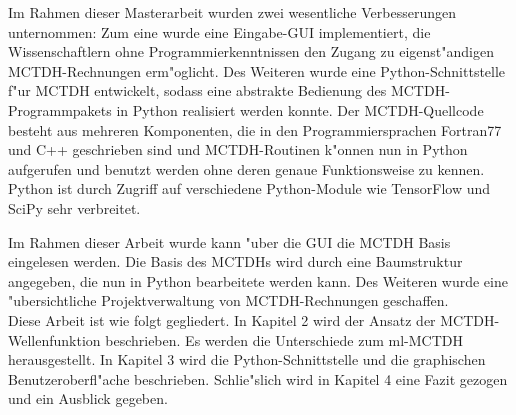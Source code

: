 Im Rahmen dieser Masterarbeit wurden zwei wesentliche Verbesserungen unternommen: Zum eine wurde eine Eingabe-GUI implementiert, die Wissenschaftlern
ohne Programmierkenntnissen den Zugang zu eigenst"andigen MCTDH-Rechnungen erm"oglicht.
Des Weiteren wurde eine Python-Schnittstelle f"ur MCTDH entwickelt, sodass eine abstrakte Bedienung des MCTDH-Programmpakets in Python
realisiert werden konnte. Der MCTDH-Quellcode besteht aus mehreren Komponenten, die in den Programmiersprachen Fortran77 und C++ geschrieben sind und
 MCTDH-Routinen k"onnen nun in Python aufgerufen und benutzt werden ohne deren genaue Funktionsweise zu kennen.
 Python ist durch Zugriff auf verschiedene Python-Module wie TensorFlow \cite{TensorFlow} und SciPy\cite{SciPy} sehr verbreitet.
 
 Im Rahmen dieser Arbeit wurde kann "uber die GUI
 die MCTDH Basis eingelesen werden. Die Basis des MCTDHs wird durch eine Baumstruktur angegeben, die nun in Python bearbeitete werden kann.
 Des Weiteren wurde eine "ubersichtliche Projektverwaltung  von MCTDH-Rechnungen geschaffen.  
\\Diese Arbeit ist wie folgt gegliedert. In Kapitel 2 wird der Ansatz der MCTDH-Wellenfunk\-tion beschrieben. Es werden die Unterschiede zum ml-MCTDH herausgestellt.
In Kapitel 3 wird die Python-Schnittstelle und die graphischen Benutzeroberfl"ache beschrieben.     
Schlie"slich wird in Kapitel 4 eine Fazit gezogen und ein Ausblick gegeben.     